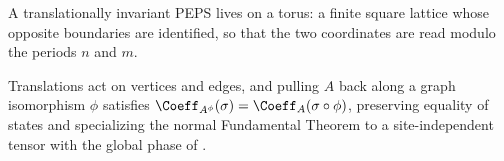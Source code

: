A translationally invariant PEPS lives on a torus: a finite square lattice whose
opposite boundaries are identified, so that the two coordinates are read modulo
the periods $n$ and $m$.
\begin{center}
    \tenkzkernel
    \begin{tenkz}[rows={ket,ket,ket}, cols=3, frame=plane, physical=up,
            west=trace, east=trace, north=trace, south=trace]
    \end{tenkz}
\end{center}
Translations act on vertices and edges, and pulling $A$ back along a graph
isomorphism $\phi$ satisfies $\Coeff_{A^\phi}(\sigma)=\Coeff_A(\sigma\circ\phi)$,
preserving equality of states and specializing the normal Fundamental Theorem to
a site-independent tensor with the global phase of
\cite[Theorem~3]{Molnar2018NormalPEPS}.

